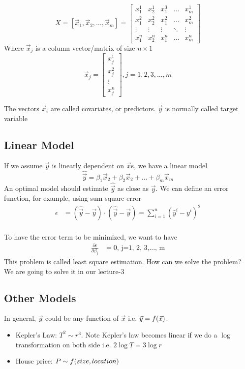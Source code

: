 \documentclass[12pt, oneside]{article}
\begin{document}
\[X=
[\vec{x}_1,\vec{x}_2, \hdots, \vec{x}_m]=
\begin{bmatrix}
    x_1^1 & x_2^1  & x_1^3  & \dots  & x_m^1 \\
    x_1^2 & x_2^2  & x_1^2  & \dots  & x_m^2\\
    \vdots& \vdots & \vdots & \ddots & \vdots \\
  	x_1^n & x_2^n  & x_1^n  & \dots  & x_m^n
\end{bmatrix}
\]
Where $\vec{x}_j$ is a column vector/matrix of size $n\times 1$
\[
\vec{x}_j=
\begin{bmatrix}
    x_{j}^1      \\
    x_{j}^2      \\
    \vdots \\
    x_{j}^n    
\end{bmatrix}
, j=1, 2, 3, ..., m
\]

The vectors $\vec{x}_i$ are called covariates, or predictors. 
$\vec{y}$ is normally called  target variable 

\subsection{Linear Model}
If we assume $\vec{y}$ is linearly dependent on $\vec{x}$s, we have a linear model
$${\hat{\vec{y}}}=\beta_1\vec{x}_2+\beta_2\vec{x}_2+ \dots +\beta_m\vec{x}_m$$
An optimal model should estimate $\hat{\vec{y}}$ as close as $\vec{y}$.  We can define an error function, for example, using sum square error
\begin{align*}
\epsilon&=(\hat{\vec{y}}-\vec{y})\cdot(\hat{\vec{y}}-\vec{y})=\sum_{i=1}^n (\hat{y}^i-y^i)^2\\
\end{align*}

To have the error term to be minimized, we want to have
\begin{align*}
\frac{\partial{\epsilon}}{\partial \beta_j}&=0 \text{, j=1, 2, 3,..., m}
\end{align*}
This problem is called least square estimation. How can we solve the problem? We are going to solve it in our lecture-3


\subsection{Other Models}
In general, $\vec{y}$ could be any function of $\vec{x}$ i.e. $\vec{y}=\mathnormal{f}({\vec{x}})$.

\begin{itemize}
\item Kepler's Law: $T^2 \sim r^3$. Note Kepler's law becomes linear if we do a $\log$ transformation on both side i.e. $2\log T=3\log r$
\item House price: $P \sim \mathnormal{f}(size, location)$
\end{itemize}
\end{document}
